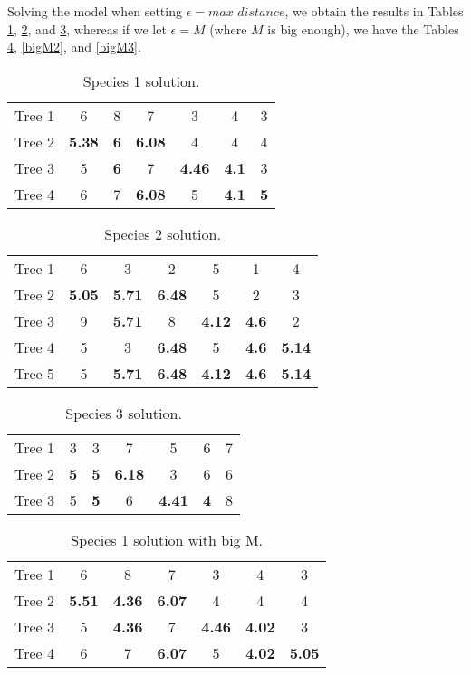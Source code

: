 \documentclass[12pt]{amsart}
\begin{document}
Solving the model when setting $\epsilon=\textit{max distance}$, we obtain the results in Tables \ref{norm1}, \ref{norm2}, and \ref{norm3}, whereas if we let $\epsilon=M$ (where $M$ is big enough), we have the Tables \ref{bigM1}, \ref{bigM2}, and \ref{bigM3}. 

\begin{table}[h]
\caption{Species 1 solution. \label{norm1}}
\begin{tabular}{l|cccccc}
Tree 1 & 6 &  8 & 7 & 3 &  4 & 3 \\
Tree 2 & \textbf{5.38}&	\textbf{6}&	\textbf{6.08} &  4 & 4 &  4 \\
Tree 3 & 5 &  \textbf{6}&  7&  \textbf{4.46}&  \textbf{4.1}&  3 \\
Tree 4 & 6 & 7 & \textbf{6.08} & 5 & \textbf{4.1} & \textbf{5} 
\end{tabular}
\end{table}

\begin{table}[h]
\caption{Species 2 solution. \label{norm2}}
\begin{tabular}{l|cccccc}
Tree 1&6& 3& 2& 5& 1& 4\\
Tree 2&\textbf{5.05}& \textbf{5.71}& \textbf{6.48}& 5& 2& 3\\
Tree 3&9& \textbf{5.71}& 8& \textbf{4.12}& \textbf{4.6}& 2\\
Tree 4&5& 3& \textbf{6.48}& 5&  \textbf{4.6}& \textbf{5.14}\\
Tree 5&5& \textbf{5.71}& \textbf{6.48}& \textbf{4.12}& \textbf{4.6}& \textbf{5.14} 
\end{tabular}
\end{table}

\begin{table}[h]
\caption{Species 3 solution. \label{norm3}}
\begin{tabular}{l|cccccc}
Tree 1&3& 3& 7& 5& 6& 7\\
Tree 2&\textbf{5}& \textbf{5}& \textbf{6.18}& 3& 6& 6\\
Tree 3&5& \textbf{5}& 6& \textbf{4.41}& \textbf{4}& 8
\end{tabular}
\end{table}

\begin{table}[h]
\caption{Species 1 solution with big M. \label{bigM1}}
\begin{tabular}{l|cccccc}
Tree 1 & 6 &  8 & 7 & 3 &  4 & 3 \\
Tree 2 & \textbf{5.51}&	\textbf{4.36}&	\textbf{6.07} &  4 & 4 &  4 \\
Tree 3 & 5 &  \textbf{4.36}&  7&  \textbf{4.46}&  \textbf{4.02}&  3 \\
Tree 4 & 6 & 7 & \textbf{6.07} & 5 & \textbf{4.02} & \textbf{5.05} 
\end{tabular}
\end{table}
\end{document}
